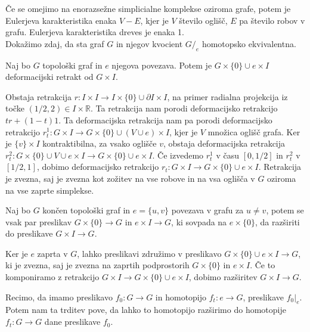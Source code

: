\documentclass[mat1]{fmfdelo}
\newcommand{\R}{\mathbb R}
\begin{document}
Če se omejimo na enorazsežne simplicialne komplekse oziroma grafe, 
potem je Eulerjeva karakteristika enaka $V-E$, kjer je $V$ število 
oglišč, $E$ pa 
število robov v grafu. Eulerjeva karakteristika dreves je enaka 1.\\
Dokažimo zdaj, da sta graf $G$ in njegov kvocient $G/_e$ homotopsko ekvivalentna.


\begin{trditev}
    Naj bo $G$ topološki graf in $e$ njegova povezava. Potem je
    $G\times \{0\}\cup e\times I$ deformacijski retrakt od $G\times I$.
\end{trditev}

\begin{dokaz}
    Obstaja retrakcija $r\colon  I\times I \rightarrow I\times \{0\} \cup \partial I \times I$, na primer radialna projekcija iz točke $(1/2,2)\in I\times \R$. Ta retrakcija nam porodi deformacijsko retrakcijo $tr+(1-t)1$. Ta deformacijska retrakcija nam pa porodi deformacijsko retrakcijo $r^1_t\colon G\times I \rightarrow G\times\{0\} \cup (V\cup e) \times I$, kjer je $V$ množica oglišč grafa. Ker je $\{v\}\times I$ kontraktibilna, za vsako oglišče $v$, obstaja deformacijska retrakcija $r^2_t\colon  G\times\{0\} \cup {V\cup e \times I}\rightarrow G\times\{0\} \cup { e \times I}$. Če izvedemo $r_t^1$ v času $[0,1/2]$ in $r^2_t$ v $[1/2,1]$, dobimo deformacijsko retrakcijo $r_t\colon G\times I \rightarrow G\times\{0\} \cup {e \times I}$. Retrakcija je zvezna, saj je zvezna kot zožitev na vse robove in na vsa oglišča v $G$ oziroma na vse zaprte simplekse.
\end{dokaz}

\begin{trditev}
    Naj bo $G$ končen topološki graf in  $e=\{u,v\}$ povezava v grafu za $u\neq v$, potem se vsak par preslikav $G\times \{0\}\rightarrow G$ in $e\times I \rightarrow G$, ki sovpada na $e\times \{0\}$, da razširiti do preslikave $G\times I \rightarrow G$.
\end{trditev}

\begin{dokaz}
    Ker je $e$ zaprta v $G$, lahko preslikavi združimo v preslikavo $G\times \{0\}\cup e\times I\rightarrow G$, ki je zvezna, saj je zvezna na zaprtih podprostorih $G\times \{0\}$ in $e\times I$. Če to komponiramo z retrakcijo $G\times I \rightarrow G\times \{0\}\cup e\times I$, dobimo razširitev $G\times I \rightarrow G.$
\end{dokaz}

Recimo, da imamo preslikavo $f_0\colon G\rightarrow G$ in homotopijo $f_t\colon e\rightarrow G$, preslikave $f_0|_e$. Potem nam ta trditev pove, da lahko to homotopijo razširimo do homotopije $f_t\colon G\rightarrow G$ dane preslikave $f_0$.
\end{document}
